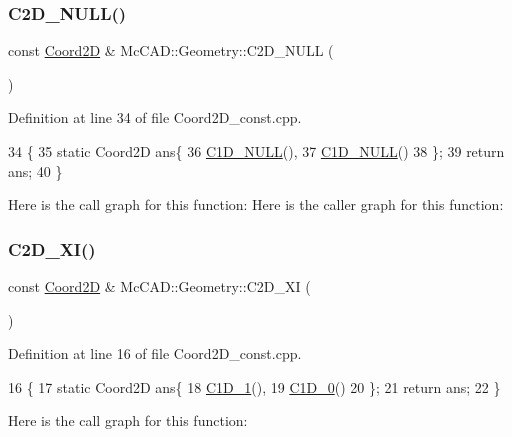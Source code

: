 \subsubsection{\texorpdfstring{C2\+D\+\_\+\+N\+U\+L\+L()}{C2D\_NULL()}}
{\footnotesize\ttfamily const \hyperlink{classMcCAD_1_1Geometry_1_1Coord2D}{Coord2D} \& Mc\+C\+A\+D\+::\+Geometry\+::\+C2\+D\+\_\+\+N\+U\+LL (\begin{DoxyParamCaption}{ }\end{DoxyParamCaption})}



Definition at line 34 of file Coord2\+D\+\_\+const.\+cpp.


\begin{DoxyCode}
34                        \{
35     \textcolor{keyword}{static} Coord2D ans\{
36         \hyperlink{namespaceMcCAD_1_1Geometry_ab581ddc27c8a6530d9c1657b77ffe0bf}{C1D\_NULL}(),
37         \hyperlink{namespaceMcCAD_1_1Geometry_ab581ddc27c8a6530d9c1657b77ffe0bf}{C1D\_NULL}()
38     \};
39     \textcolor{keywordflow}{return} ans;
40 \}
\end{DoxyCode}
Here is the call graph for this function\+:
Here is the caller graph for this function\+:
\mbox{\label{namespaceMcCAD_1_1Geometry_aba63d6531c9162396c3012cdb1957a60}} 
\subsubsection{\texorpdfstring{C2\+D\+\_\+\+X\+I()}{C2D\_XI()}}
{\footnotesize\ttfamily const \hyperlink{classMcCAD_1_1Geometry_1_1Coord2D}{Coord2D} \& Mc\+C\+A\+D\+::\+Geometry\+::\+C2\+D\+\_\+\+XI (\begin{DoxyParamCaption}{ }\end{DoxyParamCaption})}



Definition at line 16 of file Coord2\+D\+\_\+const.\+cpp.


\begin{DoxyCode}
16                      \{
17     \textcolor{keyword}{static} Coord2D ans\{
18         \hyperlink{namespaceMcCAD_1_1Geometry_ad7994c2ae088570476d26d338aa22cff}{C1D\_1}(),
19         \hyperlink{namespaceMcCAD_1_1Geometry_aef0aab16ba6382b032e4e3a8a5d37b94}{C1D\_0}()
20     \};
21     \textcolor{keywordflow}{return} ans;
22 \}
\end{DoxyCode}
Here is the call graph for this function\+:
\mbox{\label{namespaceMcCAD_1_1Geometry_a93fd5c6be0d76b39b101166f54da0a47}} 
